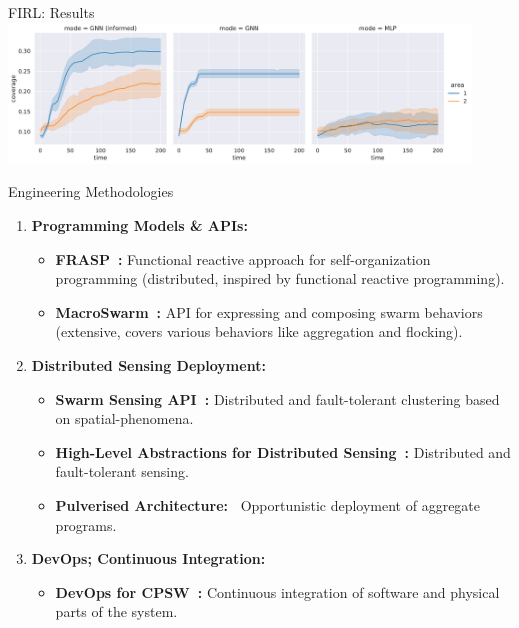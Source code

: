 \documentclass[presentation, 9pt,169]{beamer}\mode<presentation>{\usetheme{AMSBolognaFC}}
\begin{document}
\begin{frame}[allowframebreaks]{FIRL: Results}
\includegraphics[width=0.92\textwidth]{img/coverage-two-test.pdf}

\end{frame}
\begin{frame}[fragile]{Engineering Methodologies}

  \begin{enumerate}
  \item \textbf{Programming Models \& APIs:}
  
  \begin{itemize}
  \item \textbf{FRASP~\cite{frasp}:} Functional reactive approach for self-organization programming (distributed, inspired by functional reactive programming).
  \item \textbf{MacroSwarm~\cite{macroswarm}:} API for expressing and composing swarm behaviors (extensive, covers various behaviors like aggregation and flocking).
  \end{itemize}
  
  \item \textbf{Distributed Sensing Deployment:}
  
  \begin{itemize}
  \item \textbf{Swarm Sensing API~\cite{swarm-clustering}:} Distributed and fault-tolerant clustering based on spatial-phenomena.
  \item \textbf{High-Level Abstractions for Distributed Sensing~\cite{aguzzi2022dynamic}:} Distributed and fault-tolerant sensing.
  \item \textbf{Pulverised Architecture:~\cite{aguzzi2021towards}} Opportunistic deployment of aggregate programs.
  \end{itemize}
  
  \item \textbf{DevOps; Continuous Integration:}
  
  \begin{itemize}
  \item \textbf{DevOps for CPSW~\cite{casadei2022towards}:} Continuous integration of software and physical parts of the system.
  \end{itemize}
  

\end{enumerate}
\end{frame}
\end{document}
